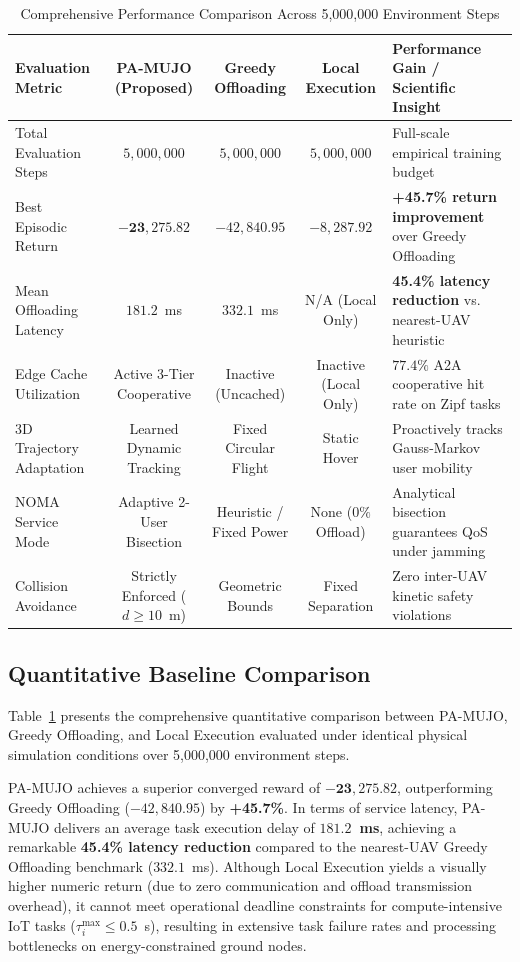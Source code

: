 \documentclass[journal]{IEEEtran}
\begin{document}
\begin{table}[!ht]
\centering
\caption{Comprehensive Performance Comparison Across 5,000,000 Environment Steps}
\label{tab:comparison_summary}
\footnotesize
\renewcommand{\arraystretch}{1.05}
\begin{tabular}{|l|c|c|c|l|}
\hline
\rowcolor{gray!20}
\textbf{Evaluation Metric} & \textbf{PA-MUJO (Proposed)} & \textbf{Greedy Offloading} & \textbf{Local Execution} & \textbf{Performance Gain / Scientific Insight} \\ \hline
Total Evaluation Steps & $5{,}000{,}000$ & $5{,}000{,}000$ & $5{,}000{,}000$ & Full-scale empirical training budget \\ \hline
Best Episodic Return & $\mathbf{-23{,}275.82}$ & $-42{,}840.95$ & $-8{,}287.92$ & \textbf{+45.7\% return improvement} over Greedy Offloading \\ \hline
Mean Offloading Latency & $\mathbf{181.2}$~ms & $332.1$~ms & N/A (Local Only) & \textbf{45.4\% latency reduction} vs. nearest-UAV heuristic \\ \hline
Edge Cache Utilization & Active 3-Tier Cooperative & Inactive (Uncached) & Inactive (Local Only) & $77.4\%$ A2A cooperative hit rate on Zipf tasks \\ \hline
3D Trajectory Adaptation & Learned Dynamic Tracking & Fixed Circular Flight & Static Hover & Proactively tracks Gauss-Markov user mobility \\ \hline
NOMA Service Mode & Adaptive 2-User Bisection & Heuristic / Fixed Power & None ($0\%$ Offload) & Analytical bisection guarantees QoS under jamming \\ \hline
Collision Avoidance & Strictly Enforced ($d \ge 10$~m) & Geometric Bounds & Fixed Separation & Zero inter-UAV kinetic safety violations \\ \hline
\end{tabular}
\end{table}

\subsection{Quantitative Baseline Comparison}
Table~\ref{tab:comparison_summary} presents the comprehensive quantitative comparison between PA-MUJO, Greedy Offloading, and Local Execution evaluated under identical physical simulation conditions over 5,000,000 environment steps.

PA-MUJO achieves a superior converged reward of $\mathbf{-23{,}275.82}$, outperforming Greedy Offloading ($-42{,}840.95$) by \textbf{+45.7\%}. In terms of service latency, PA-MUJO delivers an average task execution delay of \textbf{$181.2$~ms}, achieving a remarkable \textbf{45.4\% latency reduction} compared to the nearest-UAV Greedy Offloading benchmark ($332.1$~ms). Although Local Execution yields a visually higher numeric return (due to zero communication and offload transmission overhead), it cannot meet operational deadline constraints for compute-intensive IoT tasks ($\tau_i^{\max} \le 0.5$~s), resulting in extensive task failure rates and processing bottlenecks on energy-constrained ground nodes.
\end{document}

